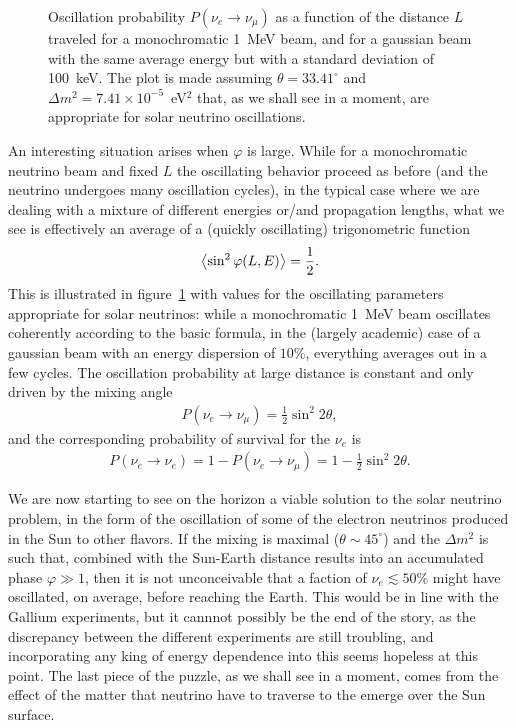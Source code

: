 \begin{figure}[!htbp]
  
  \caption{Oscillation probability $P(\nu_e \rightarrow \nu_\mu)$ as a function of
  the distance $L$ traveled for a monochromatic 1~MeV beam, and for a gaussian beam
  with the same average energy but with a standard deviation of 100~keV. The plot is
  made assuming $\theta = 33.41^\circ$ and $\Delta m^2 = 7.41 \times 10^{-5}$~eV$^2$
  that, as we shall see in a moment, are appropriate for solar neutrino oscillations.}
  \label{fig:sun_neutrino_oscillation}
\end{figure}

An interesting situation arises when $\varphi$ is large. While for a monochromatic
neutrino beam and fixed $L$ the oscillating behavior proceed as before (and the
neutrino undergoes many oscillation cycles), in the typical case where we are dealing
with a mixture of different energies or/and propagation lengths, what we see is
effectively an average of a (quickly oscillating) trigonometric function
\begin{align*}
  \left<\sin^2\varphi(L, E)\right> = \frac{1}{2}.
\end{align*}
This is illustrated in figure~\ref{fig:sun_neutrino_oscillation} with values for the
oscillating parameters appropriate for solar neutrinos: while a monochromatic 1~MeV
beam oscillates coherently according to the basic formula, in the (largely academic)
case of a gaussian beam with an energy dispersion of $10\%$, everything averages
out in a few cycles. The oscillation probability at large distance is constant and
only driven by the mixing angle
\begin{align*}
  P(\nu_e \rightarrow \nu_\mu) = \frac{1}{2} \sin^2 2\theta,
\end{align*}
and the corresponding probability of survival for the $\nu_e$ is
\begin{align*}
  P(\nu_e \rightarrow \nu_e) = 1 - P(\nu_e \rightarrow \nu_\mu) = 1 - \frac{1}{2} \sin^2 2\theta.
\end{align*}

We are now starting to see on the horizon a viable solution to the solar neutrino
problem, in the form of the oscillation of some of the electron neutrinos produced
in the Sun to other flavors. If the mixing is maximal ($\theta \sim 45^\circ$) and
the $\Delta m^2$ is such that, combined with the Sun-Earth distance results into an
accumulated phase $\varphi \gg 1$, then it is not unconceivable that a faction of
$\nu_e \lesssim 50\%$ might have oscillated, on average, before reaching the Earth.
This would be in line with the Gallium experiments, but it cannnot possibly be the
end of the story, as the discrepancy between the different experiments are still
troubling, and incorporating any king of energy dependence into this seems hopeless
at this point. The last piece of the puzzle, as we shall see in a moment, comes from
the effect of the matter that neutrino have to traverse to the emerge over the Sun
surface.


